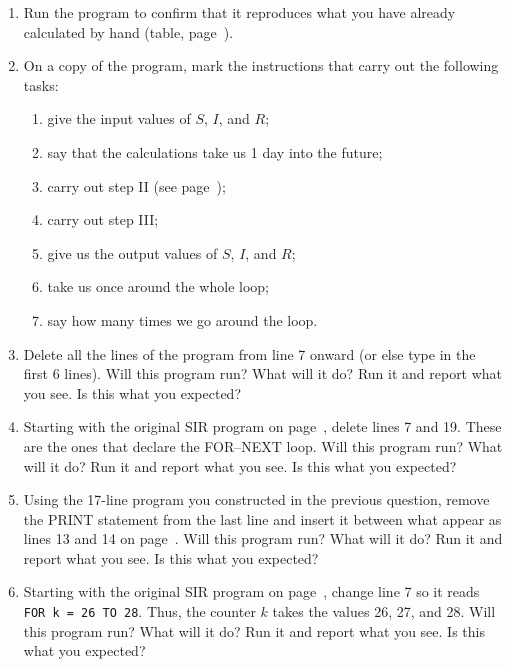 \begin{enumerate}
\item Run the program to confirm that it reproduces what you have
already calculated by hand (table, page~\pageref{`threeday'}).



\item On a copy of the program, mark the instructions that carry out
the following tasks:


  \begin{enumerate}
  \item give the input values of $S$, $I$, and $R$;


  \item say that the calculations take us 1 day into the future;


  \item carry out step II (see page~\pageref{`flowchart'});


  \item carry out step III;


  \item give us the output values of $S$, $I$, and $R$;


  \item take us once around the whole loop;


  \item say how many times we go around the loop.



\end{enumerate}
\item Delete all the lines of the program from line 7 onward (or else
type in the first 6 lines).  Will this program run?  What will it do?
Run it and report what you see.  Is this what you expected?



\item Starting with the original SIR program on page~\pageref{prog},
delete lines 7 and 19.  These are the ones that declare the FOR--NEXT
loop.  Will this program run?  What will it do?  Run it and report
what you see.  Is this what you expected?



\item Using the 17-line program you constructed in the previous
question, remove the PRINT statement from the last line and insert it
between what appear as lines 13 and 14 on page~\pageref{prog}.  Will
this program run?  What will it do?  Run it and report what you see.
Is this what you expected?



\item Starting with the original SIR program on page~\pageref{prog},
change line 7 so it reads {\tt FOR k = 26 TO 28}.  Thus, the counter
$k$ takes the values 26, 27, and 28.  Will this program run?  What
will it do?  Run it and report what you see.  Is this what you
expected?



\end{enumerate}
